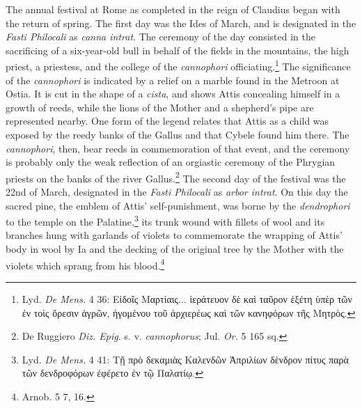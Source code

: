 \documentclass[a4paper, 11pt, oneside, polutonikogreek, english]{article}
\begin{document}
The annual festival at Rome as completed in the reign of Claudius began with the return of spring. The first day was the Ides of March, and is designated in the \emph{Fasti Philocali} as \emph{canna intrat}. The ceremony of the day consisted in the sacrificing of a six-year-old bull in behalf of the fields in the mountains, the high priest, a priestess, and the college of the \emph{cannophori} officiating.\footnote{Lyd. \emph{De Mens.} 4 36: Εἰδοῖς Μαρτίαις... ἱεράτευον δὲ καὶ ταῦρον ἑξέτη ὑπὲρ τῶν ἐν τοὶς ὄρεσιν ἀγρῶν, ἡγομένου τοῦ ἀρχιερέως καὶ τῶν κανηφόρων τῆς Μητρὸς.} The significance of the \emph{cannophori} is indicated by a relief on a marble found in the Metroon at Ostia. It is cut in the shape of a \emph{cista}, and shows Attis concealing himself in a growth of reeds, while the lions of the Mother and a shepherd's pipe are represented nearby. One form of the legend relates that Attis as a child was exposed by the reedy banks of the Gallus and that Cybele found him there. The \emph{cannophori}, then, bear reeds in commemoration of that event, and the ceremony is probably only the weak reflection of an orgiastic ceremony of the Phrygian priests on the banks of the river Gallus.\footnote{De Ruggiero \emph{Diz. Epig.} s. v. \emph{cannophorus}; Jul. \emph{Or.} 5 165 sq.} The second day of the festival was the 22nd of March, designated in the \emph{Fasti Philocali} as \emph{arbor intrat}. On this day the sacred pine, the emblem of Attis' self-punishment, was borne by the \emph{dendrophori} to the temple on the Palatine,\footnote{Lyd. \emph{De Mens.} 4 41: Τῇ πρὸ δεκαμιὰς Καλενδῶν Ἀπριλίων δὲνδρον πίτυς παρὰ τῶν δενδροφόρων ἐφέρετο ἐν τῷ Παλατίῳ.} its trunk wound with fillets of wool and its branches hung with garlands of violets to commemorate the wrapping of Attis' body in wool by Ia and the decking of the original tree by the Mother with the violets which sprang from his blood.\footnote{Arnob. 5 7, 16.}
\end{document}
